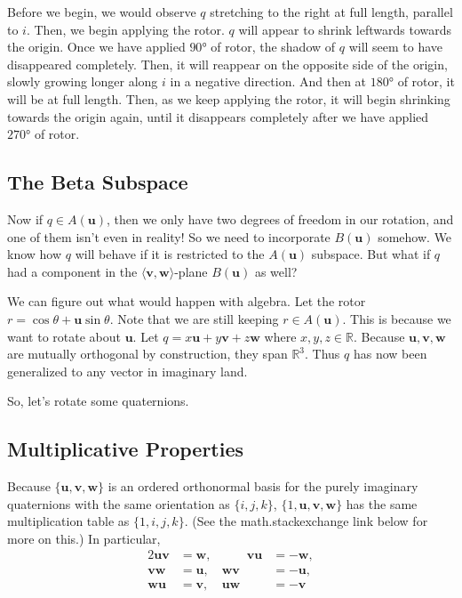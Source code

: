 \documentclass[12pt]{article}
\begin{document}
	Before we begin, we would observe $q$ stretching to the right at full length, parallel to $i$.
	Then, we begin applying the rotor. 
	$q$ will appear to shrink leftwards towards the origin. 
	Once we have applied $90\si{\degree}$ of rotor, the shadow of $q$ will seem to have disappeared completely. 
	Then, it will reappear on the opposite side of the origin, slowly growing longer along $i$ in a negative direction. 
	And then at $180\si{\degree}$ of rotor, it will be at full length. 
	Then, as we keep applying the rotor, it will begin shrinking towards the origin again, until it disappears completely after we have applied $270\si{\degree}$ of rotor.
	
	\subsection{The Beta Subspace}
	
	Now if $q \in A(\mathbf{u})$, then we only have two degrees of freedom in our rotation, and one of them isn't even in reality! 
	So we need to incorporate $B(\mathbf{u})$ somehow. 
	We know how $q$ will behave if it is restricted to the $A(\mathbf{u})$ subspace. 
	But what if $q$ had a component in the $\langle \mathbf{v}, \mathbf{w} \rangle$-plane $B(\mathbf{u})$ as well?
	
	We can figure out what would happen with algebra. 
	Let the rotor $r = \cos\theta + \mathbf{u}\sin\theta$. 
	Note that we are still keeping $r \in A(\mathbf{u})$. 
	This is because we want to rotate about $\mathbf{u}$. 
	Let $q = x\mathbf{u} + y\mathbf{v} + z\mathbf{w}$ where $x, y, z \in \mathbb{R}$. 
	Because $\mathbf{u}, \mathbf{v}, \mathbf{w}$ are mutually orthogonal by construction, they span $\mathbb{R}^3$. 
	Thus $q$ has now been generalized to any vector in imaginary land.
	
	So, let's rotate some quaternions.
	
	\subsection{Multiplicative Properties}
	
	Because $\{\mathbf{u}, \mathbf{v}, \mathbf{w}\}$ is an ordered orthonormal basis for the purely imaginary quaternions with the same orientation as $\{i, j, k\}$, $\{1, \mathbf{u}, \mathbf{v}, \mathbf{w}\}$ has the same multiplication table as $\{1, i, j, k\}$. 
	(See the math.stackexchange link below for more on this.) 
	In particular,
		\begin{alignat*}{2}
			\mathbf{uv} & = \mathbf{w}, & \qquad \mathbf{vu} & = \mathbf{-w}, \\
			\mathbf{vw} & = \mathbf{u}, & \mathbf{wv} & = \mathbf{-u}, \\
			\mathbf{wu} & = \mathbf{v}, & \mathbf{uw} & = \mathbf{-v} 
		\end{alignat*}		
\end{document}
